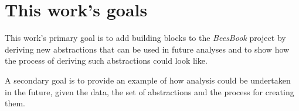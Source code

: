 \section{This work's goals}
This work’s primary goal is to add building blocks to the \textit{BeesBook}
project by deriving new abstractions that can be used in future analyses and to
show how the process of deriving such abstractions could look like.

A secondary goal is to provide an example of how analysis could be undertaken in
the future, given the data, the set of abstractions and the process for creating
them. 